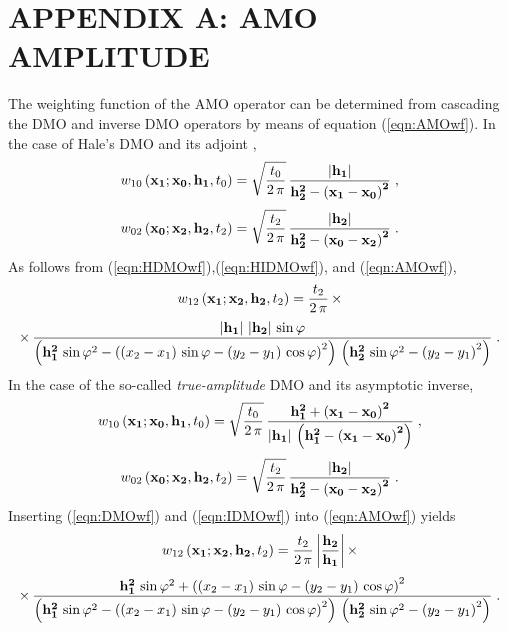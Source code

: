 \section{APPENDIX A: AMO AMPLITUDE}
The weighting function of the AMO operator can be determined from 
cascading the DMO and inverse DMO operators by means of equation
(\ref{eqn:AMOwf}). In the case of Hale's DMO \cite[]{Hale} and
its adjoint \cite[]{GEO52-07-09730984},
\begin{equation}
w_{10}\left({\bf x_1;x_0, h_1},t_0\right) = 
\sqrt{t_0 \over 2\,\pi}\,
{{\bf {\left|h_1\right|} \over {h_2^2-\left(x_1-x_0\right)^2}}}\;,
\label{eqn:HDMOwf}
\end{equation}
\begin{equation}
w_{02}\left({\bf x_0;x_2, h_2},t_2\right)  = 
\sqrt{t_2 \over 2\,\pi}\,
{{\bf {\left|h_2\right|} \over {h_2^2-\left(x_0-x_2\right)^2}}}\;.
\label{eqn:HIDMOwf}
\end{equation}  
As follows from (\ref{eqn:HDMOwf}),(\ref{eqn:HIDMOwf}), and (\ref{eqn:AMOwf}),
\begin{eqnarray*}
w_{12}\left({\bf x_1;x_2, h_2},t_2\right) = {t_2 \over {2\,\pi}}\,
\times
\end{eqnarray*}
\begin{eqnarray}
\times\,
{{{\bf \left|h_1\right|\,\left|h_2\right|}\,\sin{\varphi}}\over
{\left({\bf h_1^2}\,\sin{\varphi}^2-
\left(\left(x_2-x_1\right)\,\sin{\varphi}-
\left(y_2-y_1\right)\,\cos{\varphi}\right)^2\right)\,
\left({\bf h_2^2}\,\sin{\varphi}^2-\left(y_2-y_1\right)^2\right)}}\;.
\label{eqn:HAMOwfdf}
\end{eqnarray}
In the case of the so-called {\em true-amplitude} DMO
\cite[]{black} and its asymptotic inverse,
\begin{equation}
w_{10}\left({\bf x_1;x_0, h_1},t_0\right)  = 
\sqrt{t_0 \over 2\,\pi}\,
{\bf {h_1^2+\left(x_1-x_0\right)^2} \over
\left|h_1\right|\,\left(h_1^2-\left(x_1-x_0\right)^2\right)}\;,
\label{eqn:DMOwf}
\end{equation}
\begin{equation}
w_{02}\left({\bf x_0;x_2, h_2},t_2\right)  = 
\sqrt{t_2 \over 2\,\pi}\,
{{\bf {\left|h_2\right|} \over {h_2^2-\left(x_0-x_2\right)^2}}}\;.
\label{eqn:IDMOwf}
\end{equation}  
Inserting (\ref{eqn:DMOwf}) and (\ref{eqn:IDMOwf}) into (\ref{eqn:AMOwf}) yields
\begin{eqnarray*}
w_{12}\left({\bf x_1;x_2, h_2},t_2\right) = {t_2 \over {2\,\pi}}\,
{\left|{\bf h_2 \over h_1}\right|}\,\times
\end{eqnarray*}
\begin{eqnarray}
\times\,
{{{\bf h_1^2}\,\sin{\varphi}^2+
\left(\left(x_2-x_1\right)\,\sin{\varphi}-
\left(y_2-y_1\right)\,\cos{\varphi}\right)^2}\over
{\left({\bf h_1^2}\,\sin{\varphi}^2-
\left(\left(x_2-x_1\right)\,\sin{\varphi}-
\left(y_2-y_1\right)\,\cos{\varphi}\right)^2\right)\,
\left({\bf h_2^2}\,\sin{\varphi}^2-\left(y_2-y_1\right)^2\right)}}\;.
\label{eqn:AMOwfdf}
\end{eqnarray}
\appendix
